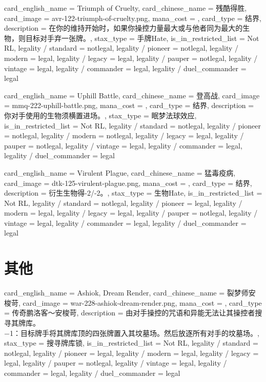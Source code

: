 \documentclass[lang = cn, color = black, 10pt]{AllThatStax}
\begin{document}
\card
{
	card_english_name = {Triumph of Cruelty},
	card_chinese_name = {残酷得胜},
	card_image = avr-122-triumph-of-cruelty.png,
	mana_cost = ,
	card_type = 结界,
	description = {在你的维持开始时，如果你操控力量最大或与他者同为最大的生物，则目标对手弃一张牌。},
	stax_type = 手牌Hate,
	is_in_restricted_list = Not RL,
	legality / standard = notlegal,
	legality / pioneer = notlegal,
	legality / modern = legal,
	legality / legacy = legal,
	legality / pauper = notlegal,
	legality / vintage = legal,
	legality / commander = legal,
	legality / duel_commander = legal
}

\card
{
	card_english_name = {Uphill Battle},
	card_chinese_name = {登高战},
	card_image = mmq-222-uphill-battle.png,
	mana_cost = ,
	card_type = 结界,
	description = {你对手使用的生物须横置进场。},
	stax_type = 眠梦法球效应,
	is_in_restricted_list = Not RL,
	legality / standard = notlegal,
	legality / pioneer = notlegal,
	legality / modern = notlegal,
	legality / legacy = legal,
	legality / pauper = notlegal,
	legality / vintage = legal,
	legality / commander = legal,
	legality / duel_commander = legal
}

\card
{
	card_english_name = {Virulent Plague},
	card_chinese_name = {猛毒疫病},
	card_image = dtk-125-virulent-plague.png,
	mana_cost = ,
	card_type = 结界,
	description = {衍生生物得-2/-2。},
	stax_type = 生物Hate,
	is_in_restricted_list = Not RL,
	legality / standard = notlegal,
	legality / pioneer = legal,
	legality / modern = legal,
	legality / legacy = legal,
	legality / pauper = notlegal,
	legality / vintage = legal,
	legality / commander = legal,
	legality / duel_commander = legal
}

\section{其他}

\card
{
	card_english_name = {Ashiok, Dream Render},
	card_chinese_name = {裂梦师安梭苛},
	card_image = war-228-ashiok-dream-render.png,
	mana_cost = ,
	card_type = 传奇鹏洛客～安梭苛,
	description = {由对手操控的咒语和异能无法让其操控者搜寻其牌库。\\
−1：目标牌手将其牌库顶的四张牌置入其坟墓场。然后放逐所有对手的坟墓场。},
	stax_type = 搜寻牌库锁,
	is_in_restricted_list = Not RL,
	legality / standard = notlegal,
	legality / pioneer = legal,
	legality / modern = legal,
	legality / legacy = legal,
	legality / pauper = notlegal,
	legality / vintage = legal,
	legality / commander = legal,
	legality / duel_commander = legal
}
\end{document}
